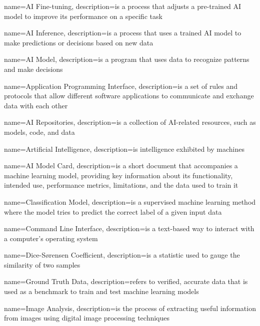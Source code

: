 
{
    name=AI Fine-tuning,
    description={is a process that adjusts a pre-trained AI model to improve
    its performance on a specific task}
}

{
    name=AI Inference,
    description={is a process that uses a trained AI model to make predictions
    or decisions based on new data}
}

{
    name=AI Model,
    description={is a program that uses data to recognize patterns and make
    decisions}
}

{
    name=Application Programming Interface,
    description={is a set of rules and protocols that allow different software
    applications to communicate and exchange data with each other}
}

{
    name=AI Repositories,
    description={is a collection of AI-related resources, such as models, code,
    and data}
}

{
    name=Artificial Intelligence,
    description={is intelligence exhibited by machines}
}

{
    name=AI Model Card,
    description={is a short document that accompanies a machine learning model,
    providing key information about its functionality, intended use,
    performance metrics, limitations, and the data used to train it}
}

{
    name=Classification Model,
    description={is a supervised machine learning method where the model tries
    to predict the correct label of a given input data}
}

{
    name=Command Line Interface,
    description={is a text-based way to interact with a computer's operating
    system}
}

{
    name=Dice-Sørensen Coefficient,
    description={is a statistic used to gauge the similarity of two samples}
}

{
    name=Ground Truth Data,
    description={refers to verified, accurate data that is used as a benchmark
    to train and test machine learning models}
}

{
    name=Image Analysis,
    description={is the process of extracting useful information from images
    using digital image processing techniques}
}

